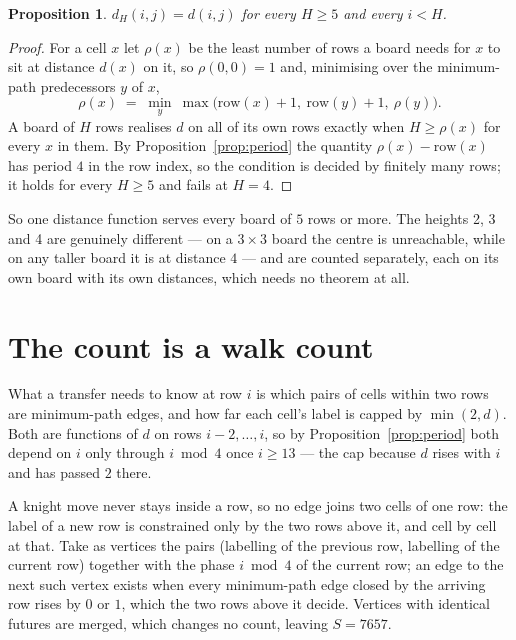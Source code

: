\documentclass[11pt,a4paper]{article}
\theoremstyle{plain}
\newtheorem{proposition}[theorem]{Proposition}
\theoremstyle{definition}
\begin{document}
\begin{proposition}\label{prop:height}
$d_H(i,j)=d(i,j)$ for every $H\ge5$ and every $i<H$.
\end{proposition}

\begin{proof}
For a cell $x$ let $\rho(x)$ be the least number of rows a board needs for $x$ to sit at distance $d(x)$ on it, so $\rho(0,0)=1$ and, minimising over the minimum-path predecessors $y$ of $x$,
\[ \rho(x)\;=\;\min_y\ \max\bigl(\mathrm{row}(x)+1,\ \mathrm{row}(y)+1,\ \rho(y)\bigr). \]
A board of $H$ rows realises $d$ on all of its own rows exactly when $H\ge\rho(x)$ for every $x$ in them. By Proposition~\ref{prop:period} the quantity $\rho(x)-\mathrm{row}(x)$ has period $4$ in the row index, so the condition is decided by finitely many rows; it holds for every $H\ge5$ and fails at $H=4$.
\end{proof}

So one distance function serves every board of $5$ rows or more. The heights 2, 3 and 4 are genuinely different --- on a $3\times3$ board the centre is unreachable, while on any taller board it is at distance $4$ --- and are counted separately, each on its own board with its own distances, which needs no theorem at all.

\section{The count is a walk count}

What a transfer needs to know at row $i$ is which pairs of cells within two rows are minimum-path edges, and how far each cell's label is capped by $\min(2,d)$. Both are functions of $d$ on rows $i-2,\dots,i$, so by Proposition~\ref{prop:period} both depend on $i$ only through $i\bmod 4$ once $i\ge13$ --- the cap because $d$ rises with $i$ and has passed $2$ there.

A knight move never stays inside a row, so no edge joins two cells of one row: the label of a new row is constrained only by the two rows above it, and cell by cell at that. Take as vertices the pairs (labelling of the previous row, labelling of the current row) together with the phase $i\bmod 4$ of the current row; an edge to the next such vertex exists when every minimum-path edge closed by the arriving row rises by $0$ or $1$, which the two rows above it decide. Vertices with identical futures are merged, which changes no count, leaving $S=7657$.
\end{document}
